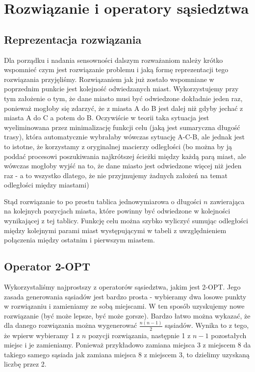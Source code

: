 \section{Rozwiązanie i operatory sąsiedztwa}
\subsection{Reprezentacja rozwiązania}
Dla porządku i nadania sensowności dalszym rozważaniom należy krótko wspomnieć czym jest rozwiązanie problemu i jaką formę reprezentacji tego rozwiązania przyjęliśmy. Rozwiązaniem jak już zostało wspomniane w poprzednim punkcie jest kolejność odwiedzanych miast. Wykorzystujemy przy tym założenie o tym, że dane miasto musi być odwiedzone dokładnie jeden raz, ponieważ mogłoby się zdarzyć, że z miasta A do B jest dalej niż gdyby jechać z miasta A do C a potem do B. Oczywiście w teorii taka sytuacja jest wyeliminowana przez minimalizację funkcji celu (jaką jest sumaryczna długość trasy), która automatycznie wybrałaby wówczas sytuację A-C-B, ale jednak jest to istotne, że korzystamy z oryginalnej macierzy odległości (bo można by ją poddać procesowi poszukiwania najkrótszej ścieżki między każdą parą miast, ale wówczas mogłoby wyjść na to, że dane miasto jest odwiedzone więcej niż jeden raz - a to wszystko dlatego, że nie przyjmujemy żadnych założeń na temat odległości między miastami)

Stąd rozwiązanie to po prostu tablica jednowymiarowa o długości $n$ zawierająca na kolejnych pozycjach miasta, które powinny być odwiedzone w kolejności wynikającej z tej tablicy. Funkcję celu można szybko wyliczyć sumując odległości między kolejnymi parami miast występującymi w tabeli z uwzględnieniem połączenia między ostatnim i pierwszym miastem.
\subsection{Operator 2-OPT}
Wykorzystaliśmy najprostszy z operatorów sąsiedztwa, jakim jest 2-OPT. Jego zasada generowania sąsiadów jest bardzo prosta - wybieramy dwa losowe punkty w rozwiązaniu i zamieniamy ze sobą miejscami. W ten sposób uzyskujemy nowe rozwiązanie (być może lepsze, być może gorsze). Bardzo łatwo można wykazać, że dla danego rozwiązania można wygenerować $\frac{n(n-1)}{2}$ sąsiadów. Wynika to z tego, że wpierw wybieramy 1 z $n$ pozycji rozwiązania, następnie 1 z $n-1$ pozostałych miejsc i je zamieniamy. Ponieważ przykładowo zamiana miejsca 3 z miejscem 8 da takiego samego sąsiada jak zamiana miejsca 8 z miejscem 3, to dzielimy uzyskaną liczbę przez 2.